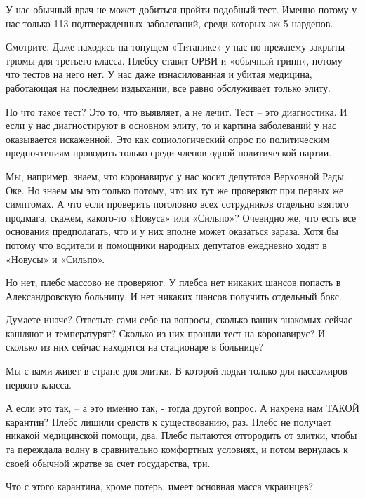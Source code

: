 У нас обычный врач не может добиться пройти подобный тест. Именно потому у нас
только 113 подтвержденных заболеваний, среди которых аж 5 нардепов.

Смотрите. Даже находясь на тонущем «Титанике» у нас по-прежнему закрыты трюмы
для третьего класса. Плебсу ставят ОРВИ и «обычный грипп», потому что тестов на
него нет. У нас даже изнасилованная и убитая медицина, работающая на последнем
издыхании, все равно обслуживает только элиту.

Но что такое тест? Это то, что выявляет, а не лечит. Тест – это диагностика. И
если у нас диагностируют в основном элиту, то и картина заболеваний у нас
оказывается искаженной. Это как социологический опрос по политическим
предпочтениям проводить только среди членов одной политической партии.

Мы, например, знаем, что коронавирус у нас косит депутатов Верховной Рады. Оке.
Но знаем мы это только потому, что их тут же проверяют при первых же симптомах.
А что если проверить поголовно всех сотрудников отдельно взятого продмага,
скажем, какого-то «Новуса» или «Сильпо»? Очевидно же, что есть все основания
предполагать, что и у них вполне может оказаться зараза. Хотя бы потому что
водители и помощники народных депутатов ежедневно ходят в «Новусы» и «Сильпо».

Но нет, плебс массово не проверяют. У плебса нет никаких шансов попасть в
Александровскую больницу. И нет никаких шансов получить отдельный бокс.

Думаете иначе? Ответьте сами себе на вопросы, сколько ваших знакомых сейчас
кашляют и температурят? Сколько из них прошли тест на коронавирус? И сколько из
них сейчас находятся на стационаре в больнице?

Мы с вами живет в стране для элитки. В которой лодки только для пассажиров
первого класса.

А если это так, – а это именно так, - тогда другой вопрос. А нахрена нам ТАКОЙ
карантин? Плебс лишили средств к существованию, раз. Плебс не получает никакой
медицинской помощи, два. Плебс пытаются отгородить от элитки, чтобы та
переждала волну в сравнительно комфортных условиях, и потом вернулась к своей
обычной жратве за счет государства, три.

Что с этого карантина, кроме потерь, имеет основная масса украинцев?

